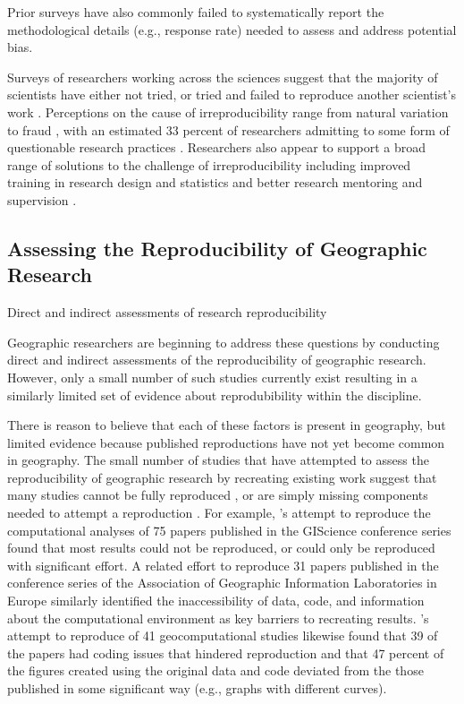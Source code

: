 \documentclass[]{interact}
\theoremstyle{plain}%
\theoremstyle{definition}
\theoremstyle{remark}
\begin{document}
Prior surveys have also commonly failed to systematically report the methodological details (e.g., response rate) needed to assess and address potential bias. 

Surveys of researchers working across the sciences suggest that the majority of scientists have either not tried, or tried and failed to reproduce another scientist's work \citep{baker20161, boulbes2018survey}. 
Perceptions on the cause of irreproducibility range from natural variation to fraud \citep{ranstam2000fraud, anderson2007normative, baker20161}, with an estimated 33 percent of researchers admitting to some form of questionable research practices \citep{fanelli2009many}.  
Researchers also appear to support a broad range of solutions to the challenge of irreproducibility including improved training in research design and statistics and better research mentoring and supervision \citep{baker20161}. 



\subsection*{Assessing the Reproducibility of Geographic Research}
Direct and indirect assessments of research reproducibility 

Geographic researchers are beginning to address these questions by conducting direct and indirect assessments of the reproducibility of geographic research. 
However, only a small number of such studies currently exist resulting in a similarly limited set of evidence about reprodubibility within the discipline. 


There is reason to believe that each of these factors is present in geography, but limited evidence because published reproductions have not yet become common in geography. 
The small number of studies that have attempted to assess the reproducibility of geographic research by recreating existing work suggest that many studies cannot be fully reproduced \citep{Kedron2021ssrn, nust2018, ostermann2021}, or are simply missing components needed to attempt a reproduction \citep{Kedron_VijayanRP, konkol2019, ostermann2021}.
For example, \citet{ostermann2021}'s attempt to reproduce the computational analyses of 75 papers published in the GIScience conference series found that most results could not be reproduced, or could only be reproduced with significant effort. 
A related effort to reproduce 31 papers published in the conference series of the Association of Geographic Information Laboratories in Europe \citep{Nust_AGILE_2020, Nust2021AGILE, Nust_AGILE_2022} similarly identified the inaccessibility of data, code, and information about the computational environment as key barriers to recreating results. 
\citet{konkol2019}'s attempt to reproduce of 41 geocomputational studies likewise found that 39 of the papers had coding issues that hindered reproduction and that 47 percent of the figures created using the original data and code deviated from the those published in some significant way (e.g., graphs with different curves). 
\end{document}
